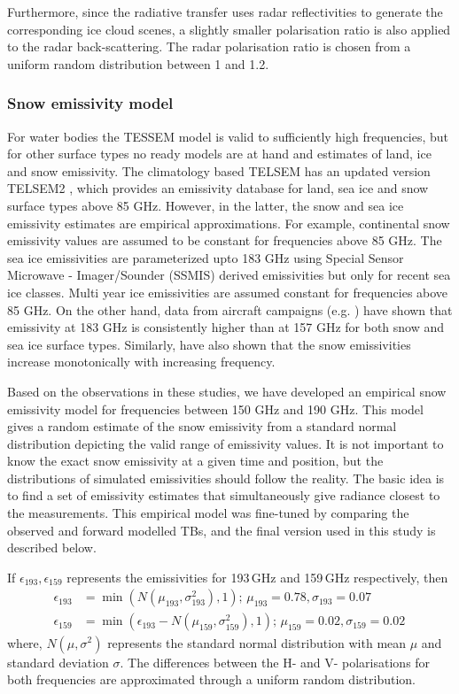 \documentclass[amt, manuscript]{copernicus}
\begin{document}
Furthermore, since the radiative transfer uses radar reflectivities to generate the corresponding ice cloud scenes, a slightly smaller polarisation ratio is also applied to the radar back-scattering. The radar polarisation ratio is chosen from a uniform random distribution between 1 and 1.2. 


\subsubsection{Snow emissivity model}
\label{sec:snow_emissivity}

For water bodies the TESSEM model is valid to sufficiently high frequencies, but for other surface types no ready models are at hand and estimates of land, ice and snow emissivity. The climatology based TELSEM has an updated version TELSEM2 \citep{wang:surfa:17}, which provides an emissivity database for land, sea ice and snow surface types above 85 GHz. However, in the latter,  the snow and sea ice emissivity estimates are empirical approximations. For example, continental snow emissivity values are assumed to be constant for frequencies above 85 GHz. The sea ice emissivities are parameterized upto 183 GHz using Special Sensor Microwave - Imager/Sounder (SSMIS) derived emissivities \citep{boukabara2011mirs} but only for recent sea ice classes. Multi year ice emissivities are assumed constant for frequencies above 85 GHz. On the other hand, data from aircraft campaigns (e.g. \citet{hewison:2002:airbo}) have shown that emissivity at 183 GHz is consistently higher than at 157 GHz for both snow and sea ice surface types. Similarly, \citet{harlow:2012:tundr} have also shown that the snow emissivities increase monotonically with increasing frequency. 

Based on the observations in these studies, we have developed an empirical snow emissivity model for frequencies between 150\,\,GHz and 190\,\,GHz. This model gives a random estimate of the snow emissivity from a standard normal distribution depicting the valid range of emissivity values. It is not important to know the exact snow emissivity at a given time and position, but the distributions of simulated emissivities should follow the reality. The basic idea is to find a set of emissivity estimates that simultaneously give radiance closest to the measurements. 
This empirical model was fine-tuned by comparing the observed and forward modelled TBs, and the final version used in this study is described below. 

If $\epsilon_{193}, \epsilon_{159}$ represents the emissivities for 193\,GHz and
159\,GHz respectively, then
\begin{align}
\epsilon_{193}& = \min({N(\mu_{193}, \sigma_{193}^{2}), 1});\, \mu_{193} = 0.78, \sigma_{193} = 0.07 \label{eq:1}\\
\epsilon_{159}& = \min(\epsilon_{193} - N(\mu_{159}, \sigma_{159}^{2}), 1) ;\,  \mu_{159} = 0.02, \sigma_{159} = 0.02\,\label{eq:2}
\end{align}
where, $N(\mu, \sigma^{2})$ represents the standard normal distribution with
mean $\mu$ and standard deviation $\sigma$. The differences between the
H- and V- polarisations for both frequencies are 
approximated through a uniform random distribution.
\end{document}

